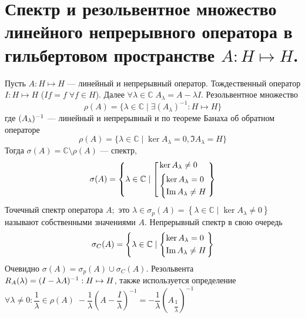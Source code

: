 \documentclass[14pt]{extarticle}
\begin{document}
\section*{Спектр и резольвентное множество линейного непрерывного оператора в гильбертовом пространстве $A : H \mapsto H$.}
Пусть $A : H \mapsto H$ --- линейный и непрерывный оператор.
Тождественный оператор $I : H \mapsto H$ ($If = f\;\forall f \in H$).
Далее $\forall \lambda \in \mathbb C\;A_\lambda = A - \lambda I$.
Резольвентное множество
$$
\rho(A) = \{ \lambda \in \mathbb C \mid \exists (A_\lambda)^{-1} : H \mapsto H \}
$$
где $(A_\lambda)^{-1}$ --- линейный и непрерывный и по теореме Банаха об обратном операторе
$$
\rho(A) = \{ \lambda \in \mathbb C \mid \ker A_\lambda = 0, \Im A_\lambda = H \}
$$
Тогда $\sigma(A) = \mathbb C \setminus \rho(A)$ --- спектр, 
$$
\sigma(A) = \left \{ \lambda \in \mathbb C \mid 
\left [
    \begin{aligned}
        &\ker A_\lambda \ne 0\\
        &\left \{
            \begin{aligned}
                &{\ker \Al = 0}\\
                &{\Im \Al \ne H}
            \end{aligned}
            \right.
    \end{aligned}
\right.\right\}
$$
Точечный спектр оператора $A;$ это $\lambda \in \sigma_p(A)= \left \{ \lambda \in \mathbb C \mid \ker A_\lambda \ne 0 \right\}$ называют собственными значениями $A$.
Непрерывный спектр в свою очередь 
$$\sigma_C(A) =  \left \{ \lambda \in \mathbb C \mid 
\left\{
    \begin{aligned}
                &{\ker \Al = 0}\\
                &{\Im \Al \ne H}
    \end{aligned}
\right.\right \}
$$
Очевидно $\sigma(A) = \sigma_p(A) \cup \sigma_C(A)$.
Резольвента $R_A(\lambda) = (I - \lambda A)^{-1} : H \mapsto H$, также используется определение
$\forall \lambda \ne 0\colon \dfrac{1}{\lambda} \in \rho(A)\;-\dfrac{1}{\lambda}(A - \dfrac{I}{\lambda})^{-1} = -\dfrac{1}{\lambda}(A_{\dfrac1{\lambda}})^{-1}$
\end{document}
